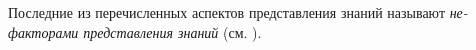 Последние из перечисленных аспектов представления знаний называют \textit{не-факторами представления знаний} (см. ).

\begin{comment}
	

\section{Синтаксис SC-кода}
\label{sec_sr_scsyntax}

\begin{SCn}
	\begin{scnrelfromlist}{подраздел}
		\scnitem{\ref{sec_syntactic_core_sc_code}~\nameref{sec_syntactic_core_sc_code}}
		\scnitem{\ref{sec_concept_syntactically_correct_sc_construction}~\nameref{sec_concept_syntactically_correct_sc_construction}}
		\scnitem{\ref{sec_syntactic_extensions_core_sc_code}~\nameref{sec_syntactic_extensions_core_sc_code}}
	\end{scnrelfromlist}
\end{SCn}

\subsection*{Введение в \ref{sec_sr_scsyntax}}
\textit{SC-коду} соответствует несколько синтаксических модификаций, каждая из которых задается:
\begin{textitemize}
	\item своим алфавитом, то есть семейством \textit{\myuline{синтаксически} выделяемых классов sc-элементов};
	\item своим способом представления (кодирования) \textit{пар инцидентности sc-элементов}, связывающих \textit{sc-элементы} между собой.
\end{textitemize}

\begin{SCn}
	\scnheader{алфавит синтаксической модификации SC-кода}
	\scnidtfexp{семейство синтаксических меток, приписываемых \textit{sc-элементам} в рамках соответствующей синтаксической модификации SC-кода и указывающих факт принадлежности \textit{sc-элемента} соответствующему классу \textit{sc-элементов} (\textit{sc-классу})}
\end{SCn}

\begin{SCn}
	\scnheader{Минимальный алфавит SC-кода\scnsupergroupsign}
	\scntext{пояснение}{Если известен смысл выделяемых классов sc-элементов (\textit{sc-классов}), каждый из которых в \textit{sc-памяти} представлен константным \textit{sc-элементом}, обозначающим этот \textit{sc-класс}, то для "анализа"{} и понимания \textit{sc-конструкций}, хранимых в \textit{sc-памяти}, достаточно синтаксически выделить только Класс \textit{константных постоянных позитивных sc-пар принадлежности}, с помощью которых каждый \textit{sc-элемент} будет \myuline{явно} соединяться с \textit{sc-элементами}, обозначающими те \textit{sc-классы}, которым этот \textit{sc-элемент} принадлежит. Очевидно, что таким явным способом выделить указанные \textit{константные постоянные позитивные sc-пар принадлежности} с помощью самих этих sc-пар невозможно.
		

\end{comment}

